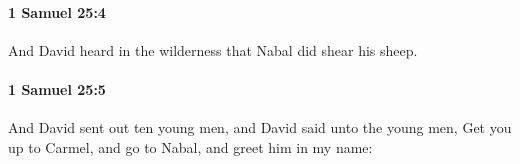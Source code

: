 		\paragraph{1 Samuel 25:4} %
			\label{1SAMUEL-25-4}

			And David heard in the wilderness that Nabal did shear his sheep.


		\paragraph{1 Samuel 25:5} %
			\label{1SAMUEL-25-5}

			And David sent out ten young men, and David said unto the young men, Get you up to Carmel, and go to Nabal, and greet him in my name:


